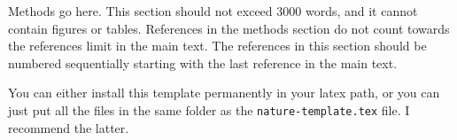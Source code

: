 



\begin{methods}

Methods go here. This section should not exceed 3000 words, and it cannot contain figures or tables. References in the methods section do not count towards the references limit in the main text. The references in this section should be numbered sequentially starting with the last reference in the main text. 

You can either install this template permanently in your latex path, or you can just put all the files in the same folder as the \verb!nature-template.tex! file. I recommend the latter. 

\end{methods}
